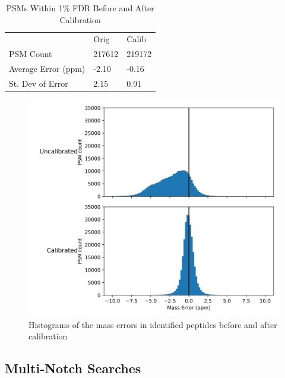 \documentclass[journal=jprobs,manuscript=article]{achemso}
\begin{document}
\begin{table}[]
\centering
\caption{PSMs Within 1\% FDR Before and After Calibration}
\label{tbl:calib}
\begin{tabular}{lll}

                                                                                      & Orig        & Calib        \\
 PSM Count                                                           &      217612   &   219172        \\
 Average Error (ppm)                                                              &      -2.10      &        -0.16      \\
 St. Dev of Error                                                    &       2.15      &        0.91      \\
\end{tabular}
\end{table}

\begin{figure}[H]
 \includegraphics{fig2-10ppmSearchCalib.png}
 \caption{Histograms of the mass errors in identified peptides before and after calibration}
 \label{fgr:fig2-10ppmSearchCalib}
\end{figure}

\newpage

\subsection{Multi-Notch Searches}
\end{document}
